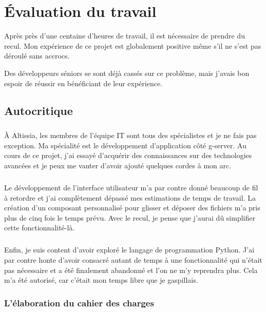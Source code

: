\chapter{Évaluation du travail}
\label{ch:evaluation}
Après près d'une centaine d'heures de travail, il est nécessaire de prendre du recul.
Mon expérience de ce projet est globalement positive même s’il ne s'est pas déroulé sans accrocs.

Des développeurs séniors se sont déjà cassés sur ce problème, mais j'avais bon espoir de réussir en bénéficiant de leur expérience.

\section{Autocritique}
\label{sec:autocritic}

\paragraph{}
À Altissia, les membres de l'équipe IT sont tous des spécialistes et je ne fais pas exception.
Ma spécialité est le développement d'application côté \gls{g-server}.
Au cours de ce projet, j'ai essayé d'acquérir des connaissances sur des technologies avancées et je peux me vanter d'avoir ajouté quelques cordes à mon arc.

\paragraph{}
Le développement de l'interface utilisateur m'a par contre donné beaucoup de fil à retordre et j'ai complètement dépassé mes estimations de temps de travail.
La création d'un composant personnalisé pour glisser et déposer des fichiers m'a pris plus de cinq fois le temps prévu.
Avec le recul, je pense que j'aurai dû simplifier cette fonctionnalité-là.

\paragraph{}
Enfin, je suis content d'avoir exploré le langage de programmation Python.
J'ai par contre honte d'avoir consacré autant de temps à une fonctionnalité qui n'était pas nécessaire et a été finalement abandonné et l'on ne m'y reprendra plus.
Cela m'a été autorisé, car c'était mon temps libre que je gaspillais.

\subsection{L'élaboration du cahier des charges}
\label{subsec:specs}

